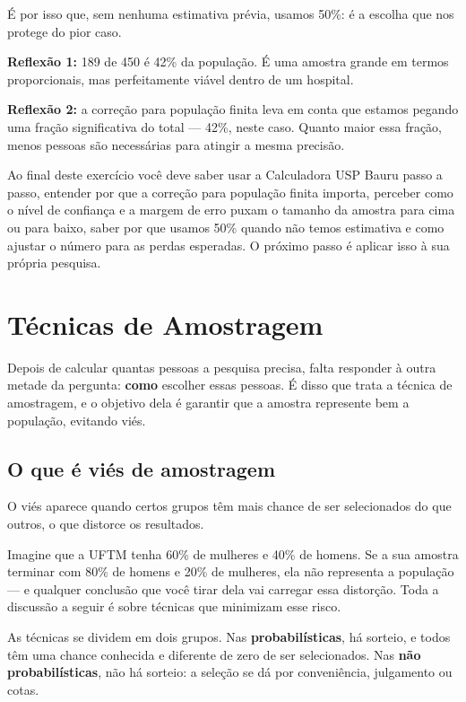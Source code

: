 \documentclass[
]{book}
\begin{document}
É por isso que, sem nenhuma estimativa prévia, usamos 50\%: é a escolha que nos protege do pior caso.

\textbf{Reflexão 1:} 189 de 450 é 42\% da população. É uma amostra grande em termos proporcionais, mas perfeitamente viável dentro de um hospital.

\textbf{Reflexão 2:} a correção para população finita leva em conta que estamos pegando uma fração significativa do total --- 42\%, neste caso. Quanto maior essa fração, menos pessoas são necessárias para atingir a mesma precisão.

Ao final deste exercício você deve saber usar a Calculadora USP Bauru passo a passo, entender por que a correção para população finita importa, perceber como o nível de confiança e a margem de erro puxam o tamanho da amostra para cima ou para baixo, saber por que usamos 50\% quando não temos estimativa e como ajustar o número para as perdas esperadas. O próximo passo é aplicar isso à sua própria pesquisa.

\chapter{Técnicas de Amostragem}\label{tuxe9cnicas-de-amostragem}

Depois de calcular quantas pessoas a pesquisa precisa, falta responder à outra metade da pergunta: \textbf{como} escolher essas pessoas. É disso que trata a técnica de amostragem, e o objetivo dela é garantir que a amostra represente bem a população, evitando viés.

\section{O que é viés de amostragem}\label{o-que-uxe9-viuxe9s-de-amostragem}

O viés aparece quando certos grupos têm mais chance de ser selecionados do que outros, o que distorce os resultados.

Imagine que a UFTM tenha 60\% de mulheres e 40\% de homens. Se a sua amostra terminar com 80\% de homens e 20\% de mulheres, ela não representa a população --- e qualquer conclusão que você tirar dela vai carregar essa distorção. Toda a discussão a seguir é sobre técnicas que minimizam esse risco.

As técnicas se dividem em dois grupos. Nas \textbf{probabilísticas}, há sorteio, e todos têm uma chance conhecida e diferente de zero de ser selecionados. Nas \textbf{não probabilísticas}, não há sorteio: a seleção se dá por conveniência, julgamento ou cotas.
\end{document}
